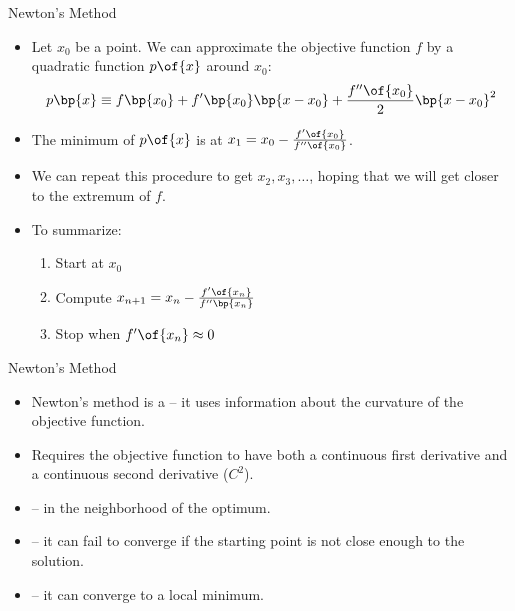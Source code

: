\documentclass[11pt,xcolor={dvipsnames},aspectratio=159,hyperref={pdftex,pdfpagemode=UseNone,hidelinks,pdfdisplaydoctitle=true},usepdftitle=false]{beamer}
\begin{document}
\begin{frame}{Newton's Method}

\begin{itemize}
    \item Let $x_0$ be a point. We can approximate the objective function $f$ by a quadratic function $p\of{x}$ around $x_0$: 
    $$ p\bp{x} \equiv f\bp{x_0} + f^\prime\bp{x_0} \bp{x-x_0} + \frac{f^{\prime\prime}\of{x_0}}{2} \bp{x-x_0}^2$$ 
    \item The minimum of $p\of{x}$ is at $x_1 = x_0 - \frac{f^\prime\of{x_0}}{f^{\prime\prime} \of{x_0}}$.
    \item We can repeat this procedure to get $x_2, x_3, \dots$, hoping that we will get closer to the extremum of $f$.

    
    \item To summarize:

    \begin{enumerate}
        \item Start at $x_0$
        \item Compute $x_{n+1} = x_n - \frac{f^\prime\of{x_n}}{f^{\prime\prime} \bp{x_n}}$
        \item Stop when $f^\prime\of{x_n} \approx 0$
    \end{enumerate}
    \end{itemize}
    \end{frame}


\begin{frame}{Newton's Method}
    \begin{itemize}
        \item Newton's method is a  -- it uses information about the curvature of the objective function.
        \item Requires the objective function to have both a continuous first derivative and a continuous second derivative ($C^2$).
        \item {} --  in the neighborhood of the optimum.
        \item {} -- it can fail to converge if the starting point is not close enough to the solution.
        \item {} -- it can converge to a local minimum.
    \end{itemize}
    \end{frame}
\end{document}
